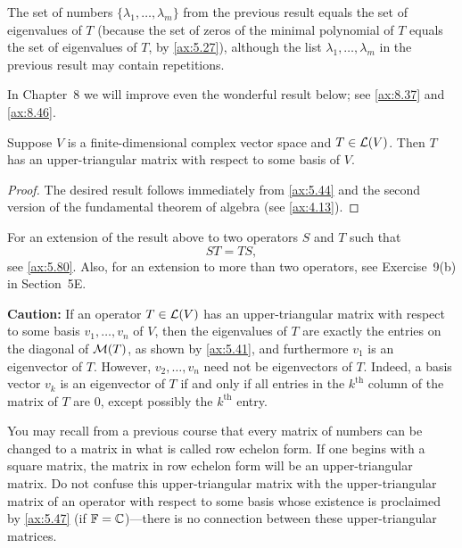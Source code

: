 The set of numbers $\{\lambda_1,\dots,\lambda_m\}$ from the previous result
equals the set of eigenvalues of $T$ (because the set of zeros of the minimal
polynomial of $T$ equals the set of eigenvalues of $T$, by \ref{ax:5.27}),
although the list $\lambda_1,\dots,\lambda_m$ in the previous result may contain
repetitions.

In Chapter~8 we will improve even the wonderful result below; see \ref{ax:8.37}
and \ref{ax:8.46}.

\begin{result}[If $\F=\C$, then every operator on $V$ has an upper-triangular
matrix]\label{ax:5.47}
Suppose $V$ is a finite-dimensional complex vector space and $T\in\mathcal{L}(V)$. Then
$T$ has an upper-triangular matrix with respect to some basis of $V$.
\end{result}

\begin{proof}
The desired result follows immediately from \ref{ax:5.44} and the second version
of the fundamental theorem of algebra (see \ref{ax:4.13}).
\end{proof}

For an extension of the result above to two operators $S$ and $T$ such that
\[ ST=TS, \]
see \ref{ax:5.80}. Also, for an extension to more than two operators, see
Exercise~9(b) in Section~5E.

\textbf{Caution:} If an operator $T\in\mathcal{L}(V)$ has an upper-triangular matrix
with respect to some basis $v_1,\dots,v_n$ of $V$, then the eigenvalues of $T$
are exactly the entries on the diagonal of $\mathcal{M}(T)$, as shown by
\ref{ax:5.41}, and furthermore $v_1$ is an eigenvector of $T$. However,
$v_2,\dots,v_n$ need not be eigenvectors of $T$. Indeed, a basis vector $v_k$ is
an eigenvector of $T$ if and only if all entries in the $k^{\text{th}}$ column
of the matrix of $T$ are $0$, except possibly the $k^{\text{th}}$ entry.

%
You may recall from a previous course that every matrix of numbers can be
changed to a matrix in what is called row echelon form. If one begins with a
square matrix, the matrix in row echelon form will be an upper-triangular matrix.
Do not confuse this upper-triangular matrix with the upper-triangular matrix of
an operator with respect to some basis whose existence is proclaimed by
\ref{ax:5.47} (if $\F=\C$)---there is no connection between these
upper-triangular matrices.

